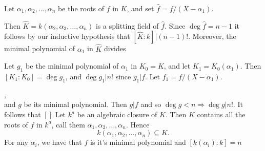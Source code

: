 \documentclass{article}
\theoremstyle{definition}
\begin{document}
Let $\alpha_1, \alpha_2, \ldots, \alpha_n$ be the roots of $f$ in $K$, and set
$\hat{f} = f/(X - \alpha_1)$. 

Then $\hat{K} = k(\alpha_2, \alpha_3, \ldots,
\alpha_n)$ is a splitting field of $\hat{f}$. Since $\deg \hat{f} = n - 1$
it follows by our inductive hypothesis that $[\hat{K} : k] | (n - 1)!$. Moreover,
the minimal polynomial of $\alpha_1$ in $\hat{K}$ divides 

Let $g_1$ be the minimal polynomial of
$\alpha_1$ in $K_0 = K$, and let $K_1 = K_0(\alpha_1)$. Then $[K_1: K_0] = \deg
g_1$, and $\deg g_1 | n!$ since $g_1 | f$. Let $f_1 = f / (X - \alpha_1)$. 

,\\
and $g$ be its minimal polynomial.
Then $g | f$ and so $\deg g < n \Rightarrow \deg g | n!$. It follows
that $[]$
Let $k^{a}$ be an algebraic closure of $K$. Then $K$ contains all the roots of
$f$ in $k^{a}$, call them $\alpha_1, \alpha_2, \ldots, \alpha_n$. Hence
\[
	k(\alpha_1, \alpha_2, \ldots, \alpha_n) \subseteq K.
\] 
For any $\alpha_i$, we have that $f$ is it's minimal polynomial and 
$[k(\alpha_i): k] = n$
 
\end{document}
